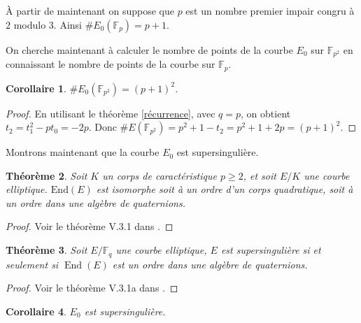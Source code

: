 \documentclass{article}
\theoremstyle{plain}%
\newtheorem{thm}{Théorème}[section]
\newtheorem{cor}[thm]{Corollaire}
\theoremstyle{definition}%
\newcommand{\F}{\mathbb{F}}
\DeclareMathOperator{\End}{End}
\begin{document}
À partir de maintenant on suppose que $p$ est un nombre premier impair congru à $2$ modulo $3$. 
Ainsi $\#E_0(\F_{p}) = p+1$. 


On cherche maintenant à calculer le nombre de points de la courbe $E_0$ sur $\F_{p^2}$ en connaissant le nombre de points de la courbe sur $\F_{p}$.

\begin{cor}
$\#E_0(\F_{p^2}) = (p+1)^2$.
\end{cor}

\begin{proof}
  En utilisant le théorème \ref{récurrence}, avec $q = p$, on obtient $t_2 = t_1^2 - pt_0 = -2p$. Donc $\#E(\F_{p^2}) = p^2 + 1 - t_2 = p^2 + 1 + 2p = (p+1)^2$.
\end{proof}


Montrons maintenant que la courbe $E_0$ est supersingulière.

\begin{thm}
  Soit $K$ un corps de caractéristique $p\ge 2$, et soit $E/K$ une courbe elliptique. $\mathrm{End}(E)$ est isomorphe soit à un ordre d'un corps quadratique, soit à un ordre dans une algèbre de quaternions. 
\end{thm}

\begin{proof}
  Voir le théorème V.3.1 dans \cite{Silverman}.
\end{proof}

\begin{thm}
  Soit $E/\F_q$ une courbe elliptique, $E$ est supersingulière si et seulement si $\End(E)$ est un ordre dans une algèbre de quaternions.
\end{thm}

\begin{proof}
  Voir le théorème V.3.1a dans \cite{Silverman}.
\end{proof}

\begin{cor}
  $E_0$ est supersingulière.
\end{cor}
\end{document}
